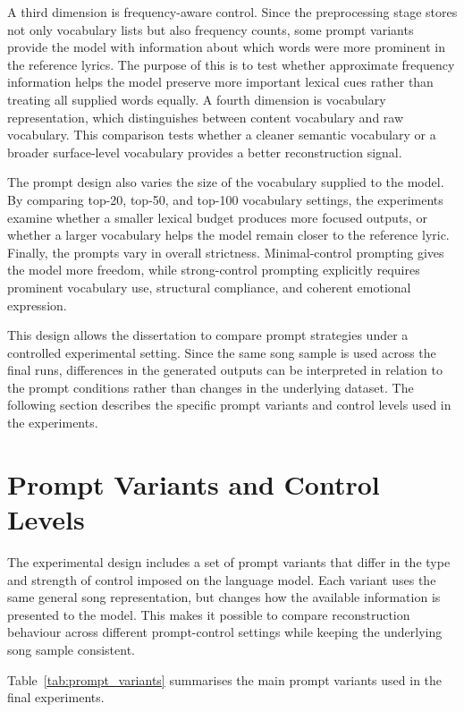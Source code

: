 A third dimension is frequency-aware control. Since the preprocessing stage stores not only vocabulary lists but also frequency counts, some prompt variants provide the model with information about which words were more prominent in the reference lyrics. The purpose of this is to test whether approximate frequency information helps the model preserve more important lexical cues rather than treating all supplied words equally. A fourth dimension is vocabulary representation, which distinguishes between content vocabulary and raw vocabulary. This comparison tests whether a cleaner semantic vocabulary or a broader surface-level vocabulary provides a better reconstruction signal.

The prompt design also varies the size of the vocabulary supplied to the model. By comparing top-20, top-50, and top-100 vocabulary settings, the experiments examine whether a smaller lexical budget produces more focused outputs, or whether a larger vocabulary helps the model remain closer to the reference lyric. Finally, the prompts vary in overall strictness. Minimal-control prompting gives the model more freedom, while strong-control prompting explicitly requires prominent vocabulary use, structural compliance, and coherent emotional expression.

This design allows the dissertation to compare prompt strategies under a controlled experimental setting. Since the same song sample is used across the final runs, differences in the generated outputs can be interpreted in relation to the prompt conditions rather than changes in the underlying dataset. The following section describes the specific prompt variants and control levels used in the experiments.

\section{Prompt Variants and Control Levels}

The experimental design includes a set of prompt variants that differ in the type and strength of control imposed on the language model. Each variant uses the same general song representation, but changes how the available information is presented to the model. This makes it possible to compare reconstruction behaviour across different prompt-control settings while keeping the underlying song sample consistent.

Table~\ref{tab:prompt_variants} summarises the main prompt variants used in the final experiments.

